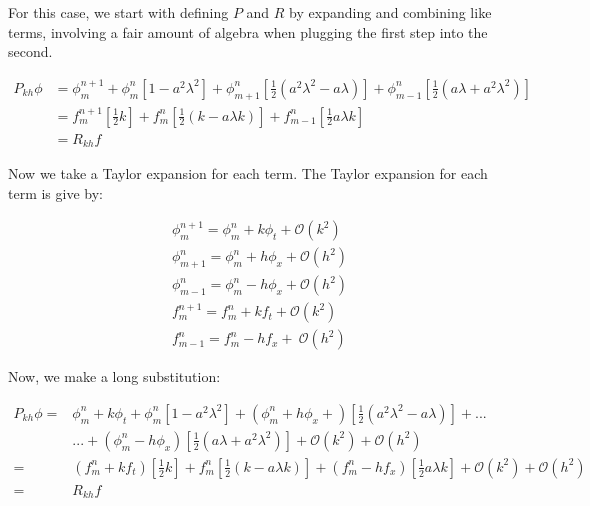 \documentclass[12pt]{article}
\begin{document}
For this case, we start with defining $P$ and $R$ by expanding and combining like terms, involving a fair amount of algebra when plugging the first step into the second.

\begin{equation*}
    \begin{aligned}
    P_{kh}\phi & = \phi_m^{n+1} + 
    \phi_{m}^{n}\left[1-a^2\lambda^2\right] + 
    \phi_{m+1}^{n}\left[\frac{1}{2}(a^2\lambda^2 - a\lambda)\right] + 
    \phi_{m-1}^{n}\left[\frac{1}{2}(a\lambda + a^2\lambda^2)\right] \\
     & = f_{m}^{n+1}\left[\frac{1}{2}k\right] +f_{m}^{n}\left[\frac{1}{2}(k-a\lambda k)\right] +f_{m-1}^{n}\left[\frac{1}{2}a\lambda k\right] \\
     & = R_{kh}f
    \end{aligned}
\end{equation*}

\noindent Now we take a Taylor expansion for each term. The Taylor expansion for each term is give by:

\begin{equation*}
\begin{aligned}
	\phi_m^{n+1} = \phi_m^n + k\phi_t + \mathcal{O}(k^2)\\
	\phi_{m+1}^n = \phi_m^n + h\phi_x + \mathcal{O}(h^2)\\
	\phi_{m-1}^n = \phi_m^n - h\phi_x + \mathcal{O}(h^2)\\
	f_m^{n+1} = f_m^n + kf_t + \mathcal{O}(k^2)\\
	f_{m-1}^n = f_m^n - hf_x + \ \mathcal{O}(h^2)
\end{aligned}
\end{equation*}

\noindent Now, we make a long substitution:

\begin{equation*}
    \begin{aligned}
    P_{kh}\phi = & \phi_m^n + k\phi_t + \phi_{m}^{n}\left[1-a^2\lambda^2\right] + \left(\phi_m^n + h\phi_x  + \right)\left[\frac{1}{2}(a^2\lambda^2 - a\lambda)\right] +...\\
    &...+\left(\phi_m^n - h\phi_x \right)\left[\frac{1}{2}(a\lambda + a^2\lambda^2)\right] +\mathcal{O}(k^2) + \mathcal{O}(h^2)\\
      = &\left(f_m^n + kf_t \right)\left[\frac{1}{2}k\right] + f_{m}^{n}\left[\frac{1}{2}(k-a\lambda k)\right] +\left(f_m^n - hf_x \right)\left[\frac{1}{2}a\lambda k\right] + \mathcal{O}(k^2) + \mathcal{O}(h^2)\\
      =& R_{kh}f
    \end{aligned}
\end{equation*}
\end{document}
